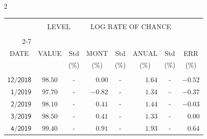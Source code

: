 \begin{multicols}{2}{ 
\begin{tabular}{rccrcrcr} 
\hline 
 \multicolumn{1}{|c|}{}  &  \multicolumn{2}{c|}{} & 
\multicolumn{4}{c}{} & \multicolumn{1}{|c|}{}\vspace{-.10in}\\ 
\multicolumn{1}{|c|}{}  &  \multicolumn{2}{c|}{LEVEL} & 
\multicolumn{4}{c}{LOG RATE OF CHANCE} & \multicolumn{1}{|c|}{}    \\  
\multicolumn{1}{|c|}{}  &  \multicolumn{2}{c|}{} & 
\multicolumn{4}{c}{} & \multicolumn{1}{|c|}{}\vspace{-.10in}\\ \cline{2-7} 
\multicolumn{1}{|c|}{ } &\multicolumn{1}{c|}{ } & \multicolumn{1}{c|}{} & \multicolumn{1}{c|}{} & \multicolumn{1}{c|}{}     & \multicolumn{1}{c|}{} & \multicolumn{1}{c|}{}  & \multicolumn{1}{c|}{}  \vspace{-.05in}\\  
\multicolumn{1}{|c|}{DATE } &\multicolumn{1}{c|}{ VALUE} & \multicolumn{1}{c|}{Std} & \multicolumn{1}{c|}{MONT} & \multicolumn{1}{c|}{Std}     & \multicolumn{1}{c|}{ANUAL} & \multicolumn{1}{c|}{Std}  & \multicolumn{1}{c|}{ERR}\\  
\multicolumn{1}{|c|}{ }      & \multicolumn{1}{c|}{  }    & \multicolumn{1}{c|}{($\%$)}&  \multicolumn{1}{c|}{($\%$)  }  & \multicolumn{1}{c|}{($\%$)} & \multicolumn{1}{c|}{($\%$) }     & \multicolumn{1}{c|}{ ($\%$) }  &  \multicolumn{1}{c|}{ ($\%$) } \\  
 \hline 
 \\$\mathsf{      12/2018}$ &$\mathsf{    98.50}$ &     - &$\mathsf{    0.00}$ &     - &$\mathsf{     1.64 }$ &     - &$\mathsf{  -0.52} $ \vspace{-.005in}\\ 
$\mathsf{       1/2019}$ &$\mathsf{    97.70}$ &     - &$\mathsf{   -0.82}$ &     - &$\mathsf{     1.34 }$ &     - &$\mathsf{  -0.37} $ \vspace{-.005in}\\ 
$\mathsf{       2/2019}$ &$\mathsf{    98.10}$ &     - &$\mathsf{    0.41}$ &     - &$\mathsf{     1.44 }$ &     - &$\mathsf{  -0.03} $ \vspace{-.005in}\\ 
$\mathsf{       3/2019}$ &$\mathsf{    98.50}$ &     - &$\mathsf{    0.41}$ &     - &$\mathsf{     1.33 }$ &     - &$\mathsf{   0.00} $ \vspace{-.005in}\\ 
$\mathsf{       4/2019}$ &$\mathsf{    99.40}$ &     - &$\mathsf{    0.91}$ &     - &$\mathsf{     1.93 }$ &     - &$\mathsf{   0.64} $ \vspace{-.005in}\\ 

\end{tabular}}
\end{multicols}
